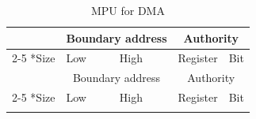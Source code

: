 \begin{longtable}[h]{|p{1.5cm}|p{3cm}|p{3cm}|p{6cm}|p{1.5cm}|}

    \caption{MPU for DMA}
    \label{table:MPU_for_DMA}
    \\\hline
    \rowcolor{lightgray}
    & \multicolumn{2}{c|}{Boundary address} & \multicolumn{2}{c|}{Authority} \\
    \cline{2-5}
    \rowcolor{lightgray}
    \multirow{-2}*{Size} & Low & High & Register & Bit \\
    \hline
    \endfirsthead
    
    \hline
    \rowcolor{lightgray}
    & \multicolumn{2}{c|}{Boundary address} & \multicolumn{2}{c|}{Authority} \\
    \cline{2-5}
    \rowcolor{lightgray}
    \multirow{-2}*{Size} & Low & High & Register & Bit \\
    \hline
    \endhead
    
    \endfoot
    
    \hline
    \endlastfoot
    

\end{longtable}
